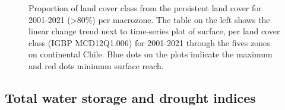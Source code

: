 \documentclass[
  number,
  preprint,
  3p]{elsarticle}
\begin{document}
\begin{figure}

\begin{minipage}[t]{0.47\linewidth}

{\centering 


}

\end{minipage}%
%
\begin{minipage}[t]{0.53\linewidth}

{\centering 


}

\end{minipage}%

\caption{\label{fig-elephants}Proportion of land cover class from the
persistent land cover for 2001-2021 (\textgreater80\%) per macrozone.
The table on the left shows the linear change trend next to time-series
plot of surface, per land cover class (IGBP MCD12Q1.006) for 2001-2021
through the fives zones on continental Chile. Blue dots on the plots
indicate the maximum and red dots minimum surface reach.}

\end{figure}

\hypertarget{total-water-storage-and-drought-indices}{%
\subsection{Total water storage and drought
indices}\label{total-water-storage-and-drought-indices}}
\end{document}
